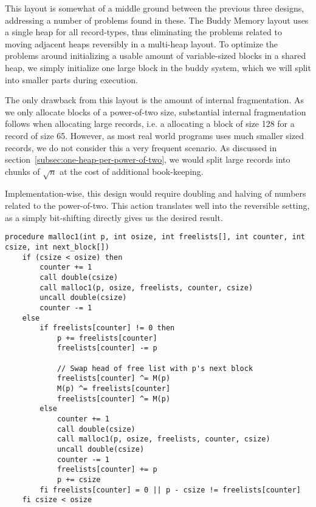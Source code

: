 This layout is somewhat of a middle ground between the previous three designs, addressing a number of problems found in these. The Buddy Memory layout uses a single heap for all record-types, thus eliminating the problems related to moving adjacent heaps reversibly in a multi-heap layout. To optimize the problems around initializing a usable amount of variable-sized blocks in a shared heap, we simply initialize one large block in the buddy system, which we will split into smaller parts during execution.

The only drawback from this layout is the amount of internal fragmentation. As we only allocate blocks of a power-of-two size, substantial internal fragmentation follows when allocating large records, i.e. a allocating a block of size 128 for a record of size 65. However, as most real world programs uses much smaller sized records, we do not consider this a very frequent scenario. As discussed in section~\ref{subsec:one-heap-per-power-of-two}, we would split large records into chunks of $\sqrt{n}$ at the cost of additional book-keeping.

Implementation-wise, this design would require doubling and halving of numbers related to the power-of-two. This action translates well into the reversible setting, as a simply bit-shifting directly gives us the desired result.

\begin{lstlisting}[caption={The Buddy Memory algorithm implemented in extended Janus.}, language=janus, style=basic, label={lst:buddy-memory}]
  procedure malloc1(int p, int osize, int freelists[], int counter, int csize, int next_block[])
    if (csize < osize) then
        counter += 1
        call double(csize)
        call malloc1(p, osize, freelists, counter, csize) 
        uncall double(csize)
        counter -= 1
    else
        if freelists[counter] != 0 then
            p += freelists[counter]
            freelists[counter] -= p

            // Swap head of free list with p's next block
            freelists[counter] ^= M(p)
            M(p) ^= freelists[counter]
            freelists[counter] ^= M(p)
        else
            counter += 1
            call double(csize)
            call malloc1(p, osize, freelists, counter, csize)
            uncall double(csize)
            counter -= 1
            freelists[counter] += p
            p += csize
        fi freelists[counter] = 0 || p - csize != freelists[counter]
    fi csize < osize   
\end{lstlisting}

